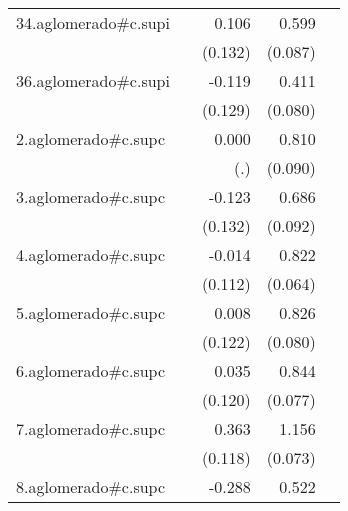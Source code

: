 {\begin{longtable}{l*{4}{D{.}{.}{-1}}}
\addlinespace
34.aglomerado#c.supi&                     &       0.106         &       0.599\sym{***}&                     \\
            &                     &     (0.132)         &     (0.087)         &                     \\
\addlinespace
36.aglomerado#c.supi&                     &      -0.119         &       0.411\sym{***}&                     \\
            &                     &     (0.129)         &     (0.080)         &                     \\
\addlinespace
2.aglomerado#c.supc&                     &       0.000         &       0.810\sym{***}&                     \\
            &                     &         (.)         &     (0.090)         &                     \\
\addlinespace
3.aglomerado#c.supc&                     &      -0.123         &       0.686\sym{***}&                     \\
            &                     &     (0.132)         &     (0.092)         &                     \\
\addlinespace
4.aglomerado#c.supc&                     &      -0.014         &       0.822\sym{***}&                     \\
            &                     &     (0.112)         &     (0.064)         &                     \\
\addlinespace
5.aglomerado#c.supc&                     &       0.008         &       0.826\sym{***}&                     \\
            &                     &     (0.122)         &     (0.080)         &                     \\
\addlinespace
6.aglomerado#c.supc&                     &       0.035         &       0.844\sym{***}&                     \\
            &                     &     (0.120)         &     (0.077)         &                     \\
\addlinespace
7.aglomerado#c.supc&                     &       0.363\sym{**} &       1.156\sym{***}&                     \\
            &                     &     (0.118)         &     (0.073)         &                     \\
\addlinespace
8.aglomerado#c.supc&                     &      -0.288\sym{*}  &       0.522\sym{***}&                     \\

\end{longtable}}
